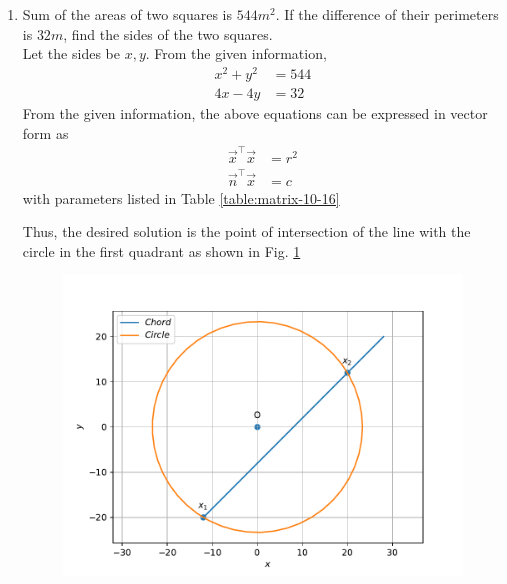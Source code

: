 \documentclass[journal,12pt,twocolumn]{IEEEtran}
\renewcommand\thesection{\arabic{section}}
\begin{document}
\begin{enumerate}[label=\thesection.\arabic*.,ref=\thesection.\theenumi]
\begin{enumerate}
	  \end{enumerate}
        \item Sum of the areas of two squares is $544 m^2$. If the difference of their perimeters is $32m$, find the sides of the two squares.\\
		\solution Let the sides be $x, y$.  From the given information, 
		    \begin{align}
			    x^2 +y^2 &= 544
			    \\
			    4x - 4y &= 32
		    \end{align}
		    From the given information, the above equations can be expressed in vector form as 
		    \begin{align}
			    \label{eq:cbse-2020-circ}
			    \vec{x}^{\top}\vec{x} &= r^2
			    \\
			    \vec{n}^{\top}\vec{x} &= c
		    \end{align}
with parameters listed in 	Table \eqref{table:matrix-10-16}
\begin{table}[ht!]
	
\caption{}
	\label{table:matrix-10-16}
\end{table}
		    Thus, the desired solution is the point of intersection of the line with the circle in the first quadrant as shown in Fig.  
	  \ref{fig:matrix-10-16.pdf}
  \begin{figure}
	  \centering 
	  \includegraphics[width=\columnwidth]{figs/matrix-10-16.pdf}
	  \caption{}
	  \label{fig:matrix-10-16.pdf}
	  \end{figure}



\end{enumerate}
\end{document}
